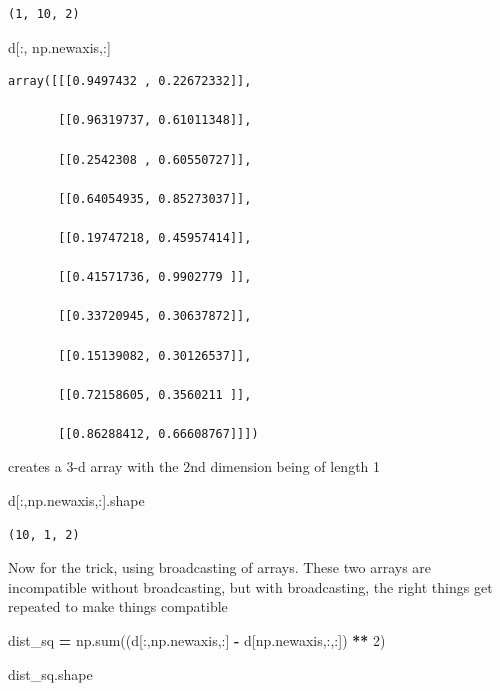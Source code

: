 \documentclass[
  letterpaper,
]{scrbook}
\newenvironment{Shaded}{\begin{snugshade}}{\end{snugshade}}
\newcommand{\BuiltInTok}[1]{#1}
\newcommand{\DecValTok}[1]{\textcolor[rgb]{0.00,0.00,0.81}{#1}}
\newcommand{\NormalTok}[1]{#1}
\newcommand{\OperatorTok}[1]{\textcolor[rgb]{0.81,0.36,0.00}{\textbf{#1}}}
\begin{document}
\begin{verbatim}
(1, 10, 2)
\end{verbatim}

\begin{Shaded}
\begin{Highlighting}[]
\NormalTok{d[:, np.newaxis,:]}
\end{Highlighting}
\end{Shaded}

\begin{verbatim}
array([[[0.9497432 , 0.22672332]],

       [[0.96319737, 0.61011348]],

       [[0.2542308 , 0.60550727]],

       [[0.64054935, 0.85273037]],

       [[0.19747218, 0.45957414]],

       [[0.41571736, 0.9902779 ]],

       [[0.33720945, 0.30637872]],

       [[0.15139082, 0.30126537]],

       [[0.72158605, 0.3560211 ]],

       [[0.86288412, 0.66608767]]])
\end{verbatim}

creates a 3-d array with the 2nd dimension being of length 1

\begin{Shaded}
\begin{Highlighting}[]
\NormalTok{d[:,np.newaxis,:].shape}
\end{Highlighting}
\end{Shaded}

\begin{verbatim}
(10, 1, 2)
\end{verbatim}

Now for the trick, using broadcasting of arrays. These two arrays are incompatible without broadcasting, but with broadcasting, the right things get repeated to make things compatible

\begin{Shaded}
\begin{Highlighting}[]
\NormalTok{dist_sq }\OperatorTok{=}\NormalTok{ np.}\BuiltInTok{sum}\NormalTok{((d[:,np.newaxis,:] }\OperatorTok{-}\NormalTok{ d[np.newaxis,:,:]) }\OperatorTok{**} \DecValTok{2}\NormalTok{)}
\end{Highlighting}
\end{Shaded}

\begin{Shaded}
\begin{Highlighting}[]
\NormalTok{dist_sq.shape}
\end{Highlighting}
\end{Shaded}
\end{document}
